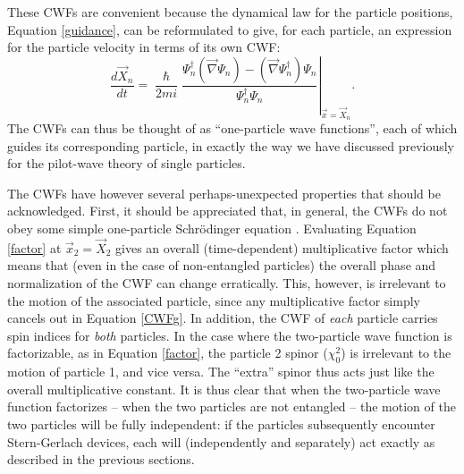 \documentclass[aps,prc,onecolumn,letterpaper,floatfix,12pt]{revtex4}
\renewcommand{\hbar}{\hslash}
\begin{document}
These 
CWFs are convenient because the dynamical law for the particle
positions, Equation \eqref{guidance}, can be reformulated to give, for
each particle, an expression for the particle velocity in terms of its
own CWF:
\begin{equation}
\frac{d \vec{X}_n}{dt} = \left. \frac{\hbar}{2mi} \frac{
    \Psi_n^\dagger (\vec{\nabla} \Psi_n ) - (\vec{\nabla}
    \Psi_n^\dagger) \Psi_n }{\Psi_n^\dagger \Psi_n} \right|_{\vec{x} = \vec{X}_n}.
\label{CWFg}
\end{equation}
The CWFs can thus be thought of as ``one-particle wave functions'',
each of which guides its corresponding particle, in exactly the way we
have discussed previously for the pilot-wave theory of single particles.

The CWFs have however several perhaps-unexpected properties that should be
acknowledged.  First, it should be appreciated that,
in general, the CWFs do not obey some simple one-particle
Schr\"odinger equation \cite{telb}.     Evaluating Equation
\eqref{factor} at $\vec{x}_2 = \vec{X}_2$ gives an overall
(time-dependent) multiplicative factor which means that (even in the
case of non-entangled particles) the overall phase and normalization
of the CWF can change erratically.  This, however, is irrelevant to
the motion of the associated particle, since any multiplicative factor
simply cancels out in Equation \eqref{CWFg}.  In addition, the CWF
of \emph{each} particle carries spin indices for \emph{both}
particles.  In the case where the
two-particle wave function is factorizable, as in Equation
\eqref{factor}, the particle 2 spinor ($\chi^2_0$) is irrelevant to
the motion of particle 1, and vice versa.  The ``extra'' spinor thus
acts just like the overall multiplicative constant.  It is thus clear
that when the two-particle wave function factorizes -- when the two
particles are not entangled --  the motion of the two particles will be fully independent:  if
the particles subsequently encounter Stern-Gerlach devices, each will
(independently and separately) act exactly as described in the
previous sections.  
\end{document}
